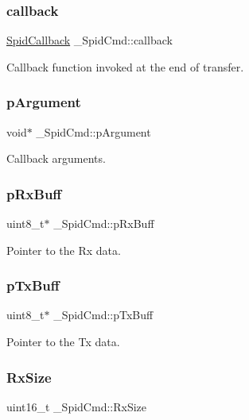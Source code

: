 \subsubsection{\texorpdfstring{callback}{callback}}
{\footnotesize\ttfamily \mbox{\hyperlink{spi__dma_8h_aebc642e37d24ab8f4151260c8a268541}{Spid\+Callback}} \+\_\+\+Spid\+Cmd\+::callback}

Callback function invoked at the end of transfer. \mbox{\label{struct__SpidCmd_a2d48379f1fe6744b5f814da190b43b8d}} 
\subsubsection{\texorpdfstring{pArgument}{pArgument}}
{\footnotesize\ttfamily void$\ast$ \+\_\+\+Spid\+Cmd\+::p\+Argument}

Callback arguments. \mbox{\label{struct__SpidCmd_a8ed8d7ecd404eb582977063a17c11b20}} 
\subsubsection{\texorpdfstring{pRxBuff}{pRxBuff}}
{\footnotesize\ttfamily uint8\+\_\+t$\ast$ \+\_\+\+Spid\+Cmd\+::p\+Rx\+Buff}

Pointer to the Rx data. \mbox{\label{struct__SpidCmd_a8e9184d79c2c9596b668d0726a661219}} 
\subsubsection{\texorpdfstring{pTxBuff}{pTxBuff}}
{\footnotesize\ttfamily uint8\+\_\+t$\ast$ \+\_\+\+Spid\+Cmd\+::p\+Tx\+Buff}

Pointer to the Tx data. \mbox{\label{struct__SpidCmd_ad780f449e7e213cf84dba3d976d4c1e1}} 
\subsubsection{\texorpdfstring{RxSize}{RxSize}}
{\footnotesize\ttfamily uint16\+\_\+t \+\_\+\+Spid\+Cmd\+::\+Rx\+Size}

